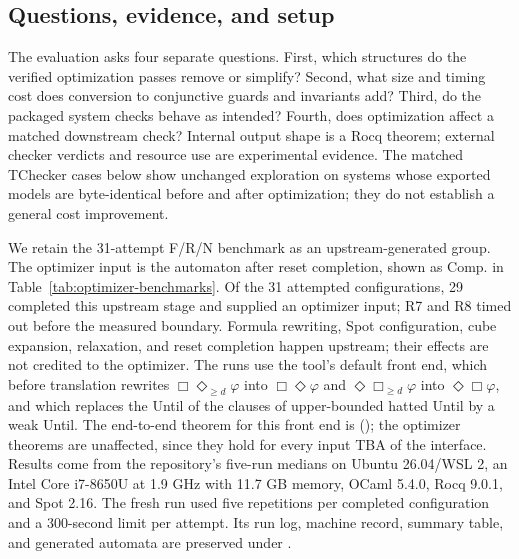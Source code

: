 \subsection{Questions, evidence, and setup}
The evaluation asks four separate questions. First, which structures do the
verified optimization passes remove or simplify? Second, what size and timing
cost does conversion to conjunctive guards and invariants add? Third, do the
packaged system checks behave as intended? Fourth, does optimization affect a
matched downstream check? Internal output shape is a Rocq theorem; external
checker verdicts and resource use are experimental evidence. The matched
TChecker cases below show unchanged exploration on systems whose exported
models are byte-identical before and after optimization; they do not establish
a general cost improvement.

We retain the 31-attempt F/R/N benchmark as an upstream-generated
group. The optimizer input is the automaton after reset completion, shown as
Comp. in Table~\ref{tab:optimizer-benchmarks}. Of the 31 attempted
configurations, 29 completed this upstream stage and supplied an optimizer
input; R7 and R8 timed out before the measured boundary. Formula rewriting, Spot
configuration, cube expansion, relaxation, and reset completion happen
upstream; their effects are not credited to the optimizer. The runs use the
tool's default front end, which before translation rewrites
$\Box\Diamond_{\ge d}\varphi$ into $\Box\Diamond\varphi$ and
$\Diamond\Box_{\ge d}\varphi$ into $\Diamond\Box\varphi$, and which replaces
the Until of the clauses of upper-bounded hatted Until by a weak Until. The
end-to-end theorem for this front end is
(); the optimizer theorems are unaffected, since
they hold for every input TBA of the interface. Results
come from the repository's five-run medians on Ubuntu 26.04/WSL 2, an Intel
Core i7-8650U at 1.9 GHz with 11.7 GB memory, OCaml 5.4.0, Rocq 9.0.1, and
Spot 2.16. The fresh run used five repetitions per completed configuration
and a 300-second limit per attempt. Its run log, machine record, summary
table, and generated automata are preserved under
.


